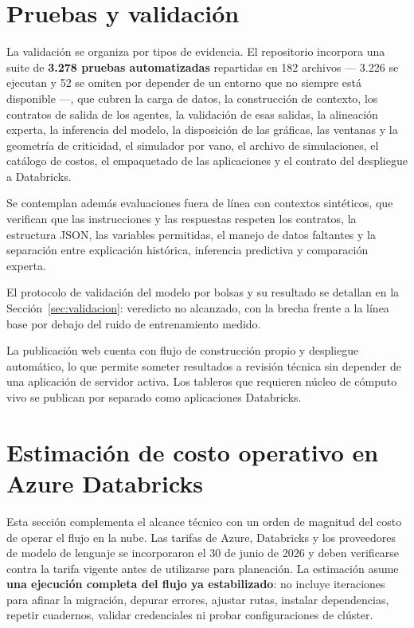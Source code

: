 \documentclass[11pt,a4paper]{article}
\begin{document}
\section{Pruebas y validación}
\label{sec:pruebas}

La validación se organiza por tipos de evidencia. El repositorio incorpora una suite de
\textbf{3.278 pruebas automatizadas} repartidas en 182 archivos --- 3.226 se ejecutan y 52 se
omiten por depender de un entorno que no siempre está disponible ---, que cubren la carga de datos,
la construcción de contexto, los contratos de salida de los agentes, la validación de esas
salidas, la alineación experta, la inferencia del modelo, la disposición de las gráficas, las
ventanas y la geometría de criticidad, el simulador por vano, el archivo de simulaciones, el
catálogo de costos, el empaquetado de las aplicaciones y el contrato del despliegue a
Databricks.

Se contemplan además evaluaciones fuera de línea con contextos sintéticos, que verifican que las
instrucciones y las respuestas respeten los contratos, la estructura JSON, las variables
permitidas, el manejo de datos faltantes y la separación entre explicación histórica, inferencia
predictiva y comparación experta.

El protocolo de validación del modelo por bolsas y su resultado se detallan en la
Sección~\ref{sec:validacion}: veredicto no alcanzado, con la brecha frente a la línea base por
debajo del ruido de entrenamiento medido.

La publicación web cuenta con flujo de construcción propio y despliegue automático, lo que
permite someter resultados a revisión técnica sin depender de una aplicación de servidor activa.
Los tableros que requieren núcleo de cómputo vivo se publican por separado como aplicaciones
Databricks.

\section{Estimación de costo operativo en Azure Databricks}

Esta sección complementa el alcance técnico con un orden de magnitud del costo de operar el
flujo en la nube. Las tarifas de Azure, Databricks y los proveedores de modelo de lenguaje se
incorporaron el 30 de junio de 2026 y deben verificarse contra la tarifa vigente antes de
utilizarse para planeación. La estimación asume \textbf{una ejecución completa del flujo ya
estabilizado}: no incluye iteraciones para afinar la migración, depurar errores, ajustar rutas,
instalar dependencias, repetir cuadernos, validar credenciales ni probar configuraciones de
clúster.
\end{document}
